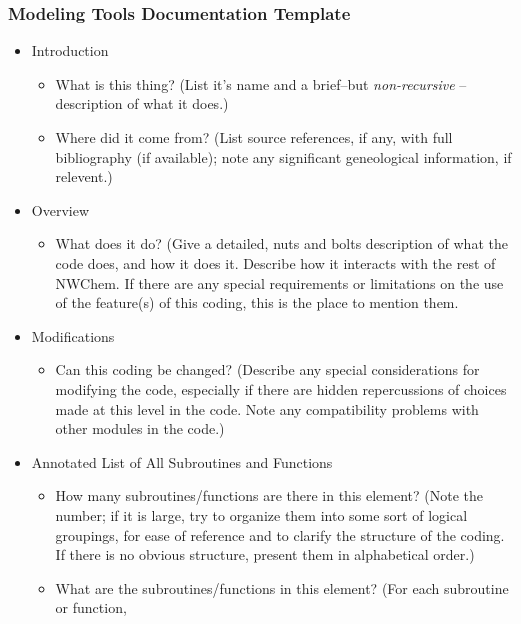 \subsubsection{Modeling Tools Documentation Template}

\begin{itemize}

\item Introduction

\begin{itemize}
\item What is this thing? (List it's name and a brief--but {\em non-recursive} --
description of what it does.)
\item Where did it come from?  (List source references, if any, with full
bibliography (if available); note any significant geneological information, if relevent.)
\end{itemize}

\item Overview

\begin{itemize}
\item What does it do? (Give a detailed, nuts and bolts description of what
the code does, and how it does it.  Describe how it interacts with the rest of
NWChem.  If there are any special requirements or limitations on the use of the
feature(s) of this coding, this is the place to
mention them.
\end{itemize}

\item Modifications

\begin{itemize}
\item Can this coding be changed?  (Describe any special considerations for
modifying the code, especially if there are hidden repercussions of choices made
at this level in the code.  Note any compatibility problems with other modules
in the code.)
\end{itemize}

\item Annotated List of All Subroutines and Functions

\begin{itemize}
\item How many subroutines/functions are there in this element?  (Note the number; if
it is large, try to organize them into some sort of logical groupings, for ease of
reference and to clarify the structure of the coding.  If there is no obvious structure,
present them in alphabetical order.)
\item What are the subroutines/functions in this element?  (For each subroutine
or function,


\end{itemize}
\end{itemize}
